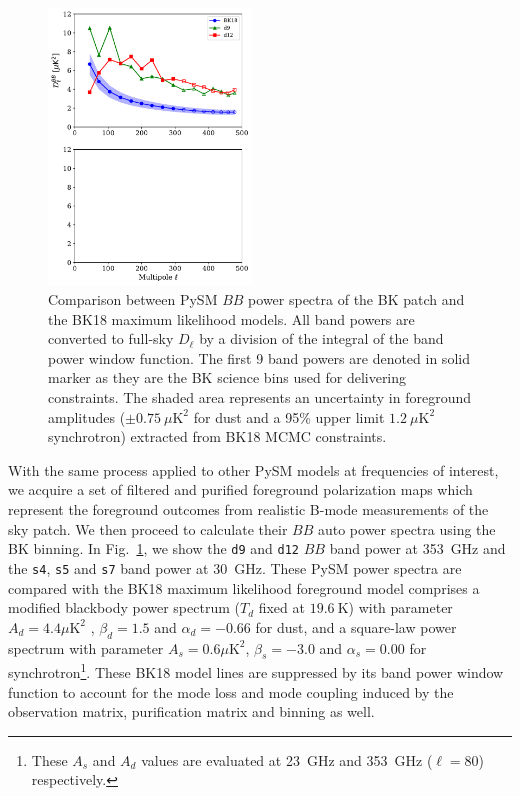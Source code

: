 \documentclass[twocolumn]{aastex631}
\begin{document}
\begin{figure}
    \centering
    \includegraphics[width=0.48\textwidth]{figures/BKfield_power.pdf}
    \caption{Comparison between PySM $BB$ power spectra of the BK patch and the BK18 maximum likelihood models. All band powers are converted to full-sky $D_\ell$ by a division of the integral of the band power window function. The first 9 band powers are denoted in solid marker as they are the BK science bins used for delivering constraints. The shaded area represents an uncertainty in foreground amplitudes ($\pm 0.75~\mu\text{K}^2$ for dust and a 95\% upper limit $1.2~\mu\text{K}^2$ synchrotron) extracted from BK18 MCMC constraints.}
    \label{fig:BKfield_power}
\end{figure}

With the same process applied to other PySM models at frequencies of interest, we acquire a set of filtered and purified foreground polarization maps which represent the foreground outcomes from realistic B-mode measurements of the sky patch. We then proceed to calculate their $BB$ auto power spectra using the BK binning. In Fig.~\ref{fig:BKfield_power}, we show the \texttt{d9} and \texttt{d12} $BB$ band power at 353~GHz and the \texttt{s4}, \texttt{s5} and \texttt{s7} band power at 30~GHz. These PySM power spectra are compared with the BK18 maximum likelihood foreground model comprises a modified blackbody power spectrum ($T_d$ fixed at $19.6~\text{K}$) with parameter $A_d = 4.4 \mu\text{K}^2$ , $\beta_d = 1.5$ and $\alpha_d = -0.66$ for dust, and a square-law power spectrum with parameter $A_s = 0.6 \mu\text{K}^2$, $\beta_s = -3.0$ and $\alpha_s = 0.00$ for synchrotron\footnote{These $A_s$ and $A_d$ values are evaluated at 23~GHz and 353~GHz ($\ell = 80$) respectively.}. These BK18 model lines are suppressed by its band power window function to account for the mode loss and mode coupling induced by the observation matrix, purification matrix and binning as well. 
\end{document}
